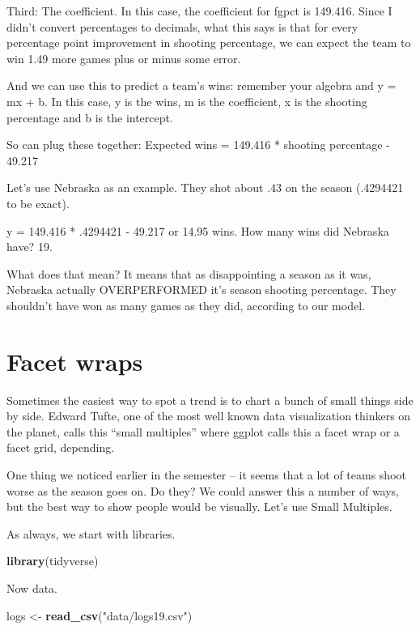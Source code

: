 \documentclass[
]{book}
\newenvironment{Shaded}{\begin{snugshade}}{\end{snugshade}}
\newcommand{\KeywordTok}[1]{\textcolor[rgb]{0.13,0.29,0.53}{\textbf{#1}}}
\newcommand{\NormalTok}[1]{#1}
\newcommand{\StringTok}[1]{\textcolor[rgb]{0.31,0.60,0.02}{#1}}
\begin{document}
Third: The coefficient. In this case, the coefficient for fgpct is 149.416. Since I didn't convert percentages to decimals, what this says is that for every percentage point improvement in shooting percentage, we can expect the team to win 1.49 more games plus or minus some error.

And we can use this to predict a team's wins: remember your algebra and y = mx + b. In this case, y is the wins, m is the coefficient, x is the shooting percentage and b is the intercept.

So can plug these together: Expected wins = 149.416 * shooting percentage - 49.217

Let's use Nebraska as an example. They shot about .43 on the season (.4294421 to be exact).

y = 149.416 * .4294421 - 49.217 or 14.95 wins. How many wins did Nebraska have? 19.

What does that mean? It means that as disappointing a season as it was, Nebraska actually OVERPERFORMED it's season shooting percentage. They shouldn't have won as many games as they did, according to our model.

\hypertarget{facet-wraps}{%
\chapter{Facet wraps}\label{facet-wraps}}

Sometimes the easiest way to spot a trend is to chart a bunch of small things side by side. Edward Tufte, one of the most well known data visualization thinkers on the planet, calls this ``small multiples'' where ggplot calls this a facet wrap or a facet grid, depending.

One thing we noticed earlier in the semester -- it seems that a lot of teams shoot worse as the season goes on. Do they? We could answer this a number of ways, but the best way to show people would be visually. Let's use Small Multiples.

As always, we start with libraries.

\begin{Shaded}
\begin{Highlighting}[]
\KeywordTok{library}\NormalTok{(tidyverse)}
\end{Highlighting}
\end{Shaded}

Now data.

\begin{Shaded}
\begin{Highlighting}[]
\NormalTok{logs <-}\StringTok{ }\KeywordTok{read_csv}\NormalTok{(}\StringTok{"data/logs19.csv"}\NormalTok{)}
\end{Highlighting}
\end{Shaded}
\end{document}

